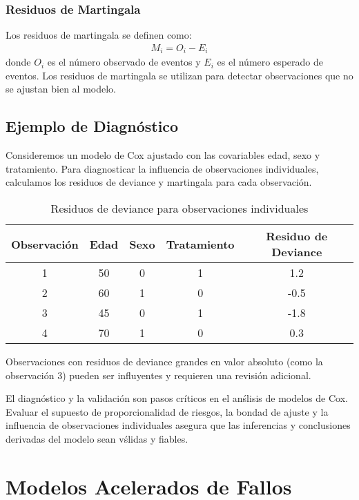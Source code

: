 \documentclass[a4paper]{report} %
\begin{document}
\subsection*{Residuos de Martingala}
Los residuos de martingala se definen como:
\begin{eqnarray*}
M_i = O_i - E_i
\end{eqnarray*}
donde $O_i$ es el n\'umero observado de eventos y $E_i$ es el n\'umero esperado de eventos. Los residuos de martingala se utilizan para detectar observaciones que no se ajustan bien al modelo.

\section*{Ejemplo de Diagn\'ostico}
Consideremos un modelo de Cox ajustado con las covariables edad, sexo y tratamiento. Para diagnosticar la influencia de observaciones individuales, calculamos los residuos de deviance y martingala para cada observaci\'on.

\begin{table}[h]
\centering
\begin{tabular}{|c|c|c|c|c|}
\hline
Observaci\'on & Edad & Sexo & Tratamiento & Residuo de Deviance \\
\hline
1 & 50 & 0 & 1 & 1.2 \\
2 & 60 & 1 & 0 & -0.5 \\
3 & 45 & 0 & 1 & -1.8 \\
4 & 70 & 1 & 0 & 0.3 \\
\hline
\end{tabular}
\caption{Residuos de deviance para observaciones individuales}
\end{table}

Observaciones con residuos de deviance grandes en valor absoluto (como la observaci\'on 3) pueden ser influyentes y requieren una revisi\'on adicional.

El diagn\'ostico y la validaci\'on son pasos cr\'iticos en el an\'slisis de modelos de Cox. Evaluar el supuesto de proporcionalidad de riesgos, la bondad de ajuste y la influencia de observaciones individuales asegura que las inferencias y conclusiones derivadas del modelo sean v\'slidas y fiables.


\chapter{Modelos Acelerados de Fallos}
\end{document}
